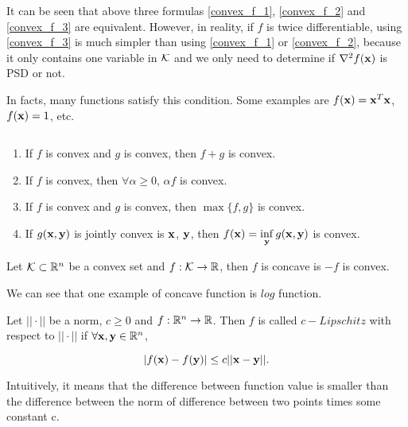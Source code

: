 \documentclass[main.tex]{subfiles}
\begin{document}
\begin{remark}
	 It can be seen that above three formulas \eqref{convex_f_1}, \eqref{convex_f_2} and \eqref{convex_f_3} are equivalent. However, in reality, if $f$ is twice differentiable, using \eqref{convex_f_3} is much simpler than using \eqref{convex_f_1} or \eqref{convex_f_2}, because it only contains one variable in $\mathcal{K}$ and we only need to determine if $\nabla^2f(\mathbf{x})$ is PSD or not.
	 
	   In facts, many functions satisfy this condition. Some examples are $f(\mathbf{x}) = \mathbf{x}^T \mathbf{x}$, $f(\mathbf{x}) = 1$, etc.
\end{remark}


\begin{proposition} $\quad$ 
	\begin{enumerate}
		\item If $f$ is convex and $g$ is convex, then $f + g$ is convex.
		\item If $f$ is convex, then $\forall \alpha \geq 0 $, $\alpha f$ is convex.
		\item If $f$ is convex and $g$ is convex, then $\max\{f,g\}$ is convex.
		\item If $g(\mathbf{x}, \mathbf{y})$ is jointly convex is $\mathbf{x}$, $\mathbf{y}$, then $f(\mathbf{x}) = \inf\limits_{\mathbf{y}} g(\mathbf{x}, \mathbf{y})$ is convex.
	\end{enumerate}
\end{proposition}

\begin{definition}
	Let $\mathcal{K} \subset  \mathbb{R}^n $ be a convex set and $f:\mathcal{K} \to \mathbb{R}$, then $f$ is concave is $-f$ is convex.
\end{definition}

We can see that one example of concave function is $log$ function.


\begin{definition}[Lipschitz]
	Let $||\cdot||$ be a norm, $c \geq 0$ and $f:\mathbb{R}^n \to \mathbb{R}$. Then $f$ is called $c-Lipschitz$ with respect to $||\cdot||$ if $\forall \mathbf{x}, \mathbf{y} \in \mathbb{R}^n$, 
	
	\begin{equation}
		|f(\mathbf{x}) - f(\mathbf{y})| \leq c||\mathbf{x} - \mathbf{y}||.
	\end{equation}
	
	Intuitively, it means that the difference between function value is smaller than the difference between the norm of difference between two points times some constant c.
\end{definition}
\end{document}
